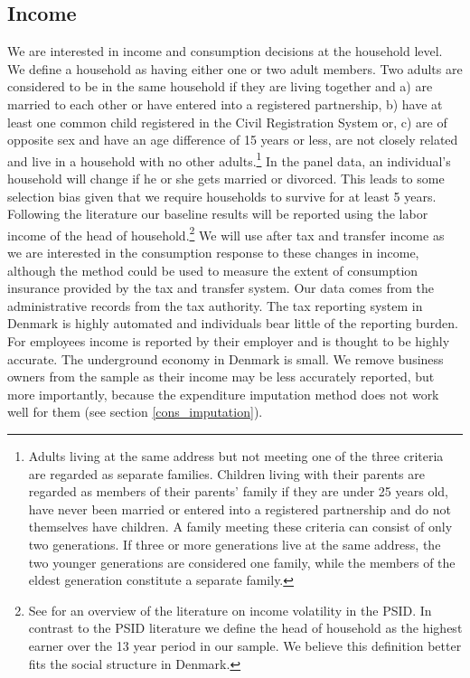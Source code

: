 \documentclass[titlepage]{\econtex}\newcommand{\texname}{ConsumptionHeterogeneity}
\begin{document}
\subsection{Income} \label{income}
We are interested in income and consumption decisions at the household level. We define a household as having either one or two adult members. Two adults are considered to be in the same household if they are living together and a) are married to each other or have entered into a registered partnership, b) have at least one common child registered in the Civil Registration System or, c) are of opposite sex and have an age difference of 15 years or less, are not closely related and live in a household with no other adults.\footnote{Adults living at the same address but not meeting one of the three criteria are regarded as separate families. Children living with their parents are regarded as members of their parents' family if they are under 25 years old, have never been married or entered into a registered partnership and do not themselves have children. A family meeting these criteria can consist of only two generations. If three or more generations live at the same address, the two younger generations are considered one family, while the members of the eldest generation constitute a separate family.} In the panel data, an individual's household will change if he or she gets married or divorced. This leads to some selection bias given that we require households to survive for at least 5 years. Following the literature our baseline results will be reported using the labor income of the head of household.\footnote{See \cite{moffitt_income_2018} for an overview of the literature on income volatility in the PSID. In contrast to the PSID literature we define the head of household as the highest earner over the 13 year period in our sample. We believe this definition better fits the social structure in Denmark.} We will use after tax and transfer income as we are interested in the consumption response to these changes in income, although the method could be used to measure the extent of consumption insurance provided by the tax and transfer system. Our data comes from the administrative records from the tax authority. The tax reporting system in Denmark is highly automated and individuals bear little of the reporting burden. For employees income is reported by their employer and is thought to be highly accurate. The underground economy in Denmark is small. We remove business owners from the sample as their income may be less accurately reported, but more importantly, because the expenditure imputation method does not work well for them (see section \ref{cons_imputation}).
\end{document}
